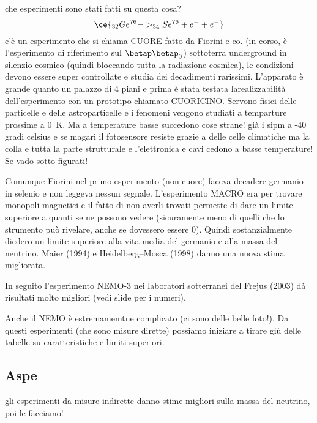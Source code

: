             che esperimenti sono stati fatti su questa cosa?
            \begin{equation*}
                \ce{_{32} Ge ^{76} -> _{34}Se^{76} + e^- + e^-}
            \end{equation*}
            c'è un esperimento che si chiama CUORE fatto da Fiorini e co. (in corso, è l'esperimento di riferimento sul $\betap\betap_0$) sottoterra underground in silenzio cosmico (quindi bloccando tutta la radiazione cosmica), le condizioni devono essere super controllate e studia dei decadimenti rarissimi. L'apparato è grande quanto un palazzo di 4 piani e prima è stata testata larealizzabilità dell'esperimento con un prototipo chiamato CUORICINO. Servono fisici delle particelle e delle astroparticelle e i fenomeni vengono studiati a temparture prossime a \SI{0}{\kelvin}. Ma a temperature basse succedono cose strane! già i sipm a -40 gradi celsius e se magari il fotosensore resiste grazie a delle celle climatiche ma la colla e tutta la parte strutturale e l'elettronica e cavi cedono a basse temperature! Se vado sotto figurati!

            Comunque Fiorini nel primo esperimento (non cuore) faceva decadere germanio in selenio e non leggeva nessun segnale. L'esperimento MACRO era per trovare monopoli magnetici e il fatto di non averli trovati permette di dare un limite superiore a quanti se ne possono vedere (sicuramente meno di quelli che lo strumento può rivelare, anche se dovessero essere 0). Quindi sostanzialmente diedero un limite superiore alla vita media del germanio e alla massa del neutrino. Maier (1994) e Heidelberg--Mosca (1998) danno una nuova stima migliorata.

            In seguito l'esperimento NEMO-3 nei laboratori sotterranei del Frejus (2003) dà risultati molto migliori (vedi slide per i numeri).

            Anche il NEMO è estremamemtne complicato (ci sono delle belle foto!). Da questi esperimenti (che sono misure dirette) possiamo iniziare a tirare giù delle tabelle su caratteristiche e limiti superiori.

        \subsection{Aspe}
            gli esperimenti da misure indirette danno stime migliori sulla massa del neutrino, poi le facciamo!
